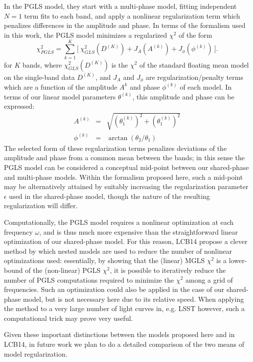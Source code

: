 \documentclass[12pt,preprint]{aastex}
\begin{document}
In the PGLS model, they start with a multi-phase model, fitting independent $N=1$ term fits to each band, and apply a nonlinear regularization term which penalizes differences in the amplitude and phase. In terms of the formalism used in this work, the PGLS model minimizes a regularized $\chi^2$ of the form
\begin{equation}
  \chi^2_{PGLS} = \sum_{k=1}^K \bigg[~\chi^2_{GLS}(D^{(K)}) + J_A(A^{(k)}) + J_\phi(\phi^{(k)})~\bigg].
\end{equation}
for $K$ bands, where $\chi^2_{GLS}(D^{(K)})$ is the $\chi^2$ of the standard floating mean model on the single-band data $D^{(K)}$, and $J_A$ and $J_\phi$ are regularization/penalty terms which are a function of the amplitude $A^{k}$ and phase $\phi^{(k)}$ of each model. In terms of our linear model parameters $\theta^{(k)}$, this amplitude and phase can be expressed:
\begin{eqnarray}
 A^{(k)} &=& \sqrt{(\theta_1^{(k)})^2 + (\theta_1^{(k)})^2}\nonumber\\
 \phi^{(k)} &=& \arctan(\theta_2 / \theta_1)
\end{eqnarray}
The selected form of these regularization terms penalizes deviations of the amplitude and phase from a common mean between the bands; in this sense the PGLS model can be considered a conceptual mid-point between our shared-phase and multi-phase models. Within the formalism proposed here, such a mid-point may be alternatively attained by suitably increasing the regularization parameter $\epsilon$ used in the shared-phase model, though the nature of the resulting regularization will differ.

Computationally, the PGLS model requires a nonlinear optimization at each frequency $\omega$, and is thus much more expensive than the straightforward linear optimization of our shared-phase model.
For this reason, LCB14 propose a clever method by which nested models are used to reduce the number of nonlinear optimizations used: essentially, by showing that the (linear) MGLS $\chi^2$ is a lower-bound of the (non-linear) PGLS $\chi^2$, it is possible to iteratively reduce the number of PGLS computations required to minimize the $\chi^2$ among a grid of frequencies.
Such an optimization could also be applied in the case of our shared-phase model, but is not necessary here due to its relative speed.
When applying the method to a very large number of light curves in, e.g. LSST however, such a computational trick may prove very useful.

Given these important distinctions between the models proposed here and in LCB14, in future work we plan to do a detailed comparison of the two means of model regularization.
\end{document}
